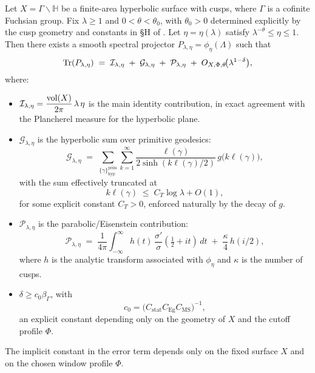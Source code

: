 \medskip

\begin{theorem}\label{thm:intro-localized-trace}
Let $X=\Gamma\backslash\mathbb{H}$ be a finite-area hyperbolic surface with cusps,
where $\Gamma$ is a cofinite Fuchsian group.
Fix $\lambda\ge 1$ and $0<\theta<\theta_0$, with $\theta_0>0$ determined explicitly
by the cusp geometry and constants in \S H of .
Let $\eta=\eta(\lambda)$ satisfy $\lambda^{-\theta}\le \eta\le 1$.
Then there exists a smooth spectral projector $P_{\lambda,\eta}=\phi_\eta(\Lambda)$
such that
\[
  \operatorname{Tr}(P_{\lambda,\eta})
  \;=\;
  \mathcal{I}_{\lambda,\eta}
  \;+\;
  \mathcal{G}_{\lambda,\eta}
  \;+\;
  \mathcal{P}_{\lambda,\eta}
  \;+\;
  O_{X,\Phi,\theta}\!\big(\lambda^{1-\delta}\big),
\]
where:
\begin{itemize}
  \item $\mathcal{I}_{\lambda,\eta} = \dfrac{\operatorname{vol}(X)}{2\pi}\,\lambda\,\eta$
        is the main identity contribution, in exact agreement with the Plancherel measure
        for the hyperbolic plane.
  \item $\mathcal{G}_{\lambda,\eta}$ is the hyperbolic sum over primitive geodesics:
  \[
    \mathcal{G}_{\lambda,\eta}
    \;=\;
    \sum_{\{\gamma\}^{\mathrm{prim}}_{\mathrm{hyp}}}
    \sum_{k=1}^\infty
    \frac{\ell(\gamma)}{2\sinh(k\ell(\gamma)/2)}\,
    g\!\big(k\ell(\gamma)\big),
  \]
  with the sum effectively truncated at
  \[
    k\ell(\gamma)\;\leq\; C_T\log\lambda + O(1),
  \]
  for some explicit constant $C_T>0$,
  enforced naturally by the decay of $g$.
  \item $\mathcal{P}_{\lambda,\eta}$ is the parabolic/Eisenstein contribution:
  \[
    \mathcal{P}_{\lambda,\eta}
    \;=\;
    \frac{1}{4\pi}\int_{-\infty}^{\infty}
      h(t)\,\frac{\sigma'}{\sigma}(\tfrac{1}{2}+it)\,dt
    \;+\;
    \frac{\kappa}{4}\,h(i/2),
  \]
  where $h$ is the analytic transform associated with $\phi_\eta$
  and $\kappa$ is the number of cusps.
  \item $\delta \geq c_0 \beta_\Gamma$, with
        \[
          c_0 = \big(C_{\mathrm{stat}} C_{\mathrm{Eg}} C_{\mathrm{MS}}\big)^{-1},
        \]
        an explicit constant depending only on the geometry of $X$ and
        the cutoff profile $\Phi$.
\end{itemize}
The implicit constant in the error term depends only on the fixed surface $X$
and on the chosen window profile $\Phi$.
\end{theorem}

